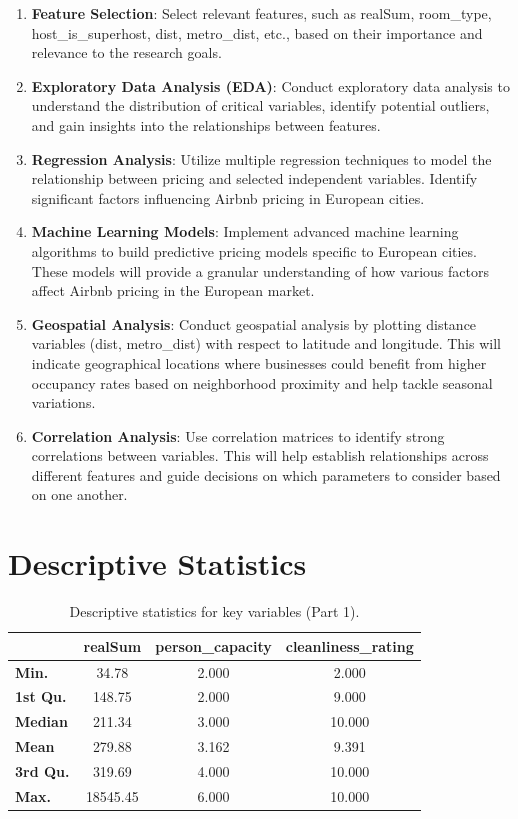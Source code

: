 \documentclass[12pt, letterpaper]{article}
\begin{document}
\begin{enumerate}
  \item \textbf{Feature Selection}: Select relevant features, such as realSum, room\_type, host\_is\_superhost, dist, metro\_dist, etc., based on their importance and relevance to the research goals.

  \item \textbf{Exploratory Data Analysis (EDA)}: Conduct exploratory data analysis to understand the distribution of critical variables, identify potential outliers, and gain insights into the relationships between features.

  \item \textbf{Regression Analysis}: Utilize multiple regression techniques to model the relationship between pricing and selected independent variables. Identify significant factors influencing Airbnb pricing in European cities.

  \item \textbf{Machine Learning Models}: Implement advanced machine learning algorithms to build predictive pricing models specific to European cities. These models will provide a granular understanding of how various factors affect Airbnb pricing in the European market.

  \item \textbf{Geospatial Analysis}: Conduct geospatial analysis by plotting distance variables (dist, metro\_dist) with respect to latitude and longitude. This will indicate geographical locations where businesses could benefit from higher occupancy rates based on neighborhood proximity and help tackle seasonal variations.

  \item \textbf{Correlation Analysis}: Use correlation matrices to identify strong correlations between variables. This will help establish relationships across different features and guide decisions on which parameters to consider based on one another.
\end{enumerate}

\section*{Descriptive Statistics}

\begin{table}[h]
\centering
\begin{tabular}{lccc}
\hline
& \textbf{realSum} & \textbf{person\_capacity} & \textbf{cleanliness\_rating} \\
\hline
\textbf{Min.} & 34.78 & 2.000 & 2.000 \\
\textbf{1st Qu.} & 148.75 & 2.000 & 9.000 \\
\textbf{Median} & 211.34 & 3.000 & 10.000 \\
\textbf{Mean} & 279.88 & 3.162 & 9.391 \\
\textbf{3rd Qu.} & 319.69 & 4.000 & 10.000 \\
\textbf{Max.} & 18545.45 & 6.000 & 10.000 \\
\hline
\end{tabular}
\caption{Descriptive statistics for key variables (Part 1).}
\end{table}
\end{document}
